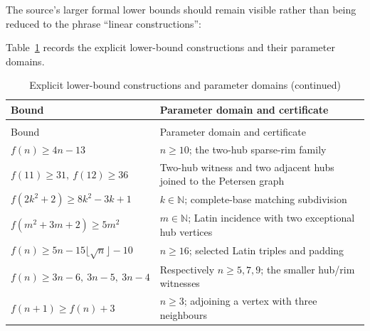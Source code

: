 \documentclass[smallextended]{svjour3}
\begin{document}
The source's larger formal lower bounds should remain visible rather
than being reduced to the phrase ``linear constructions'':

Table~\ref{tab:lower-bound-map} records the explicit lower-bound constructions and their parameter domains.

{
\begin{longtable}[]{@{}
  >{\raggedright\arraybackslash}p{}
  >{\raggedright\arraybackslash}p{}@{}}
\caption{Explicit lower-bound constructions and parameter domains}\label{tab:lower-bound-map}\\
\toprule\noalign{}
\begin{minipage}[b]{\linewidth}\raggedright
Bound
\end{minipage} & \begin{minipage}[b]{\linewidth}\raggedright
Parameter domain and certificate
\end{minipage} \\
\midrule\noalign{}
\endfirsthead
\caption[]{Explicit lower-bound constructions and parameter domains (continued)}\\
\toprule\noalign{}
\begin{minipage}[b]{\linewidth}\raggedright
Bound
\end{minipage} & \begin{minipage}[b]{\linewidth}\raggedright
Parameter domain and certificate
\end{minipage} \\
\midrule\noalign{}
\endhead
\bottomrule\noalign{}
\endlastfoot
\(f(n)\ge4n-13\) & \(n\ge10\); the two-hub sparse-rim family \\
\(f(11)\ge31,\ f(12)\ge36\) & Two-hub witness and two adjacent hubs
joined to the Petersen graph \\
\(f(2k^2+2)\ge8k^2-3k+1\) & \(k\in\mathbb{N}\); complete-base matching
subdivision \\
\(f(m^2+3m+2)\ge5m^2\) & \(m\in\mathbb{N}\); Latin incidence with two
exceptional hub vertices \\
\(f(n)\ge5n-15\lfloor\sqrt{n}\rfloor-10\) & \(n\ge16\); selected Latin
triples and padding \\
\(f(n)\ge3n-6,\ 3n-5,\ 3n-4\) & Respectively \(n\ge5,7,9\); the smaller
hub/rim witnesses \\
\(f(n+1)\ge f(n)+3\) & \(n\ge3\); adjoining a vertex with three
neighbours \\
\end{longtable}
}
\end{document}

